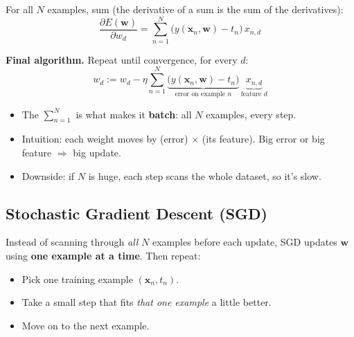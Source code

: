 For all $N$ examples, sum (the derivative of a sum is the sum of the derivatives):
\[
\frac{\partial E(\mathbf{w})}{\partial w_d} = \sum_{n=1}^{N} \big(y(\mathbf{x}_n,\mathbf{w}) - t_n\big)\, x_{n,d}
\]

\textbf{Final algorithm.} Repeat until convergence, for every $d$:
\[
w_d := w_d - \eta \sum_{n=1}^{N}
\underbrace{\big(y(\mathbf{x}_n,\mathbf{w}) - t_n\big)}_{\text{error on example } n}\,
\underbrace{x_{n,d}}_{\text{feature } d}
\]
\begin{itemize}
  \item The $\sum_{n=1}^{N}$ is what makes it \textbf{batch}: all $N$ examples, every step.
  \item Intuition: each weight moves by (error) $\times$ (its feature). Big error or big feature $\Rightarrow$ big update.
  \item Downside: if $N$ is huge, each step scans the whole dataset, so it's slow.
\end{itemize}

\subsection*{Stochastic Gradient Descent (SGD)}
Instead of scanning through \emph{all} $N$ examples before each update, SGD updates $\mathbf{w}$ using \textbf{one example at a time}. Then repeat:
\begin{itemize}
  \item Pick one training example $(\mathbf{x}_n, t_n)$.
  \item Take a small step that fits \emph{that one example} a little better.
  \item Move on to the next example.
\end{itemize}

